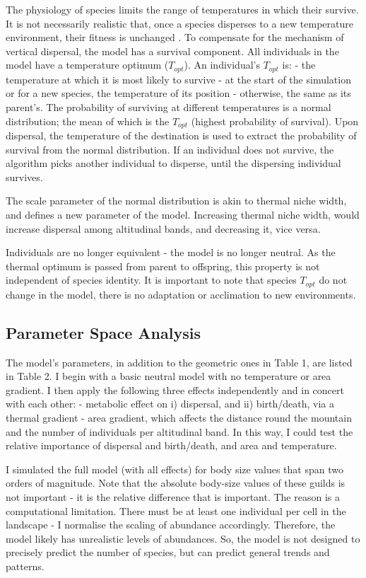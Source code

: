 \documentclass[11pt]{article}
\begin{document}
The physiology of species limits the range of temperatures in which their survive. It is not necessarily realistic that, once a species disperses to a new temperature environment, their fitness is unchanged \cite{AngillettaMichaelJ.MichaelJames2009Ta:a}. To compensate for the mechanism of vertical dispersal, the model has a survival component. All individuals in the model have a temperature optimum ($T_{opt}$). An individual's $T_{opt}$ is:
- the temperature at which it is most likely to survive
- at the start of the simulation or for a new species, the temperature of its position
- otherwise, the same as its parent's.
The probability of surviving at different temperatures is a normal distribution; the mean of which is the $T_{opt}$ (highest probability of survival). Upon dispersal, the temperature of the destination is used to extract the probability of survival from the normal distribution. If an individual does not survive, the algorithm picks another individual to disperse, until the dispersing individual survives.

The scale parameter of the normal distribution is akin to thermal niche width, and defines a new parameter of the model. Increasing thermal niche width, would increase dispersal among altitudinal bands, and decreasing it, vice versa.

Individuals are no longer equivalent - the model is no longer neutral. As the thermal optimum is passed from parent to offspring, this property is not independent of species identity. It is important to note that species $T_{opt}$ do not change in the model, there is no adaptation or acclimation to new environments.

\subsection*{Parameter Space Analysis}
The model's parameters, in addition to the geometric ones in Table 1, are listed in Table 2. I begin with a basic neutral model with no temperature or area gradient. I then apply the following three effects independently and in concert with each other:
- metabolic effect on i) dispersal, and ii) birth/death, via a thermal gradient
- area gradient, which affects the distance round the mountain and the number of individuals per altitudinal band.
In this way, I could test the relative importance of dispersal and birth/death, and area and temperature.

I simulated the full model (with all effects) for body size values that span two orders of magnitude. Note that the absolute body-size values of these guilds is not important - it is the relative difference that is important. The reason is a computational limitation. There must be at least one individual per cell in the landscape - I normalise the scaling of abundance accordingly. Therefore, the model likely has unrealistic levels of abundances. So, the model is not designed to precisely predict the number of species, but can predict general trends and patterns.
\end{document}
